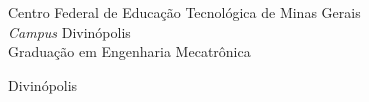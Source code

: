 \vspace*{1.0cm}

\begin{center}
{\sc  Centro Federal de Educação Tecnológica de Minas Gerais\\
{\em Campus} Divinópolis\\
Graduação em Engenharia Mecatrônica}
\end{center}

\vspace*{3.0cm}

\begin{center}
\large \autor %
\end{center}


\vspace*{2.5cm}

\begin{center}
{\sc  \titulo} %
\end{center}

\vspace*{4cm}


\null\vfill

\begin{center}
Divinópolis\\\ano %
\end{center}

\thispagestyle{empty}

\newpage

\vspace*{1.2cm}

\begin{center}
\large \autor %
\end{center}


\vspace*{3.0cm}

